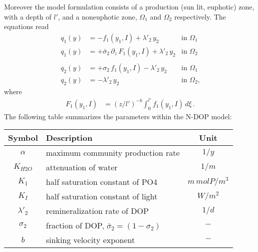 \documentclass{article}
\newcommand{\lmb}{{\lambda}}
\newcommand{\sig}{\sigma}
\newcommand{\sigb}{\bar{\sigma}}
\newcommand{\Om}{\Omega}
\newcommand{\dd}{\partial}
\begin{document}
Moreover the model formulation consists of a production (sun lit, euphotic) zone,
with a depth of $l'$, and a
noneuphotic zone, $\Om_1$ and $\Om_2$ respectively.
The equations read
%
\begin{align*}
q_1(y) & = - f_1(y_1,I)						+ \lmb'_2 \, y_2	& \text{in $\Om_1$} \\
q_1(y) & = + \sigb_2 \, \dd_z \, F_1(y_1,I)	+ \lmb'_2 \, y_2	& \text{in $\Om_2$} \\
 & \\
q_2(y) & = + \sig_2 \, f_1(y_1,I)			- \lmb'_2 \, y_2	& \text{in $\Om_1$} \\
q_2(y) & =									- \lmb'_2 \, y_2	& \text{in $\Om_2$,}
\end{align*}
%
where
%
\begin{align*}
F_1(y_1,I)	& = (z/l')^{-b} \int_0^{l'} \! f_1(y_1,I) \, d\xi \,.
\end{align*}
%
The following table summarizes the parameters within the N-DOP model:
\begin{center}
\begin{tabular}{c|l|c}
Symbol		& Description								& Unit \\ \hline
$\alpha$		& maximum community production rate			& $ 1 / y $ \\
$K_{H2O}$	& attenuation of water						& $ 1 / m $ \\
$K_1$		& half saturation constant of PO4 			& $ m \, mol P / m^3 $ \\
$K_I$		& half saturation constant of light	 		& $ W / m^2 $ \\
$\lmb'_2$	& remineralization rate of DOP 				& $1 / d$ \\
$\sig_2$ 	& fraction of DOP, $\sigb_2 = (1-\sig_2)$ 	& $ - $ \\
$b$			& sinking velocity exponent					& $ - $
\end{tabular}
\end{center}

%
%

%

\end{document}
